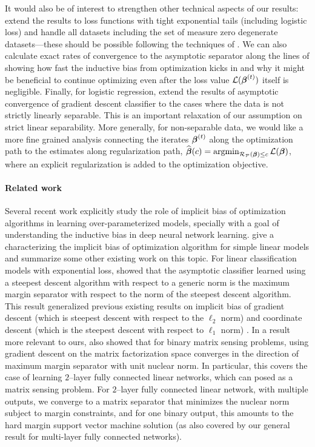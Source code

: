 \documentclass{article}
\renewcommand{\c}{\mathcal}
\renewcommand{\hat}{\widehat}
\DeclareMathOperator*{\argmin}{\mathrm{argmin}}
\newcommand{\w}[1][]{\ifthenelse{\equal{#1}{}}{\boldsymbol{\beta}}{\boldsymbol{\beta}^{(#1)}}}
\renewcommand{\P}{\mathcal{P}}
\begin{document}
It would also be of interest to strengthen other technical aspects of our results: extend the results to loss functions with tight exponential tails (including logistic loss) and handle all datasets including the set of measure zero degenerate datasets---these should be possible following the techniques of \citet{soudry2017implicit,telgarsky2013margins,ji2018risk}. We can also calculate exact rates of convergence to  the asymptotic separator along the lines of \citet{soudry2017implicit,nacson2018convergence,ji2018risk} showing how fast the inductive bias from optimization kicks in and why it might be beneficial to continue optimizing even after the loss value $\c{L}(\w[t])$ itself is negligible. 
Finally, for logistic regression, \citet{ji2018risk} extend the results of asymptotic convergence of gradient descent classifier to the cases where the data is not strictly linearly separable. This is an important relaxation of our assumption on strict linear separability. More generally, for non-separable data, we would like a more fine grained analysis connecting the iterates $\w^{(t)}$ along the optimization path to the estimates along regularization path, $\hat{\w}(c)=\argmin_{\c{R}_{\P}(\w)\le c}\c{L}(\w)$, where an explicit regularization is added to the optimization objective.  




\iffalse
\paragraph{Related work }Several recent work explicitly study the role of implicit bias of optimization algorithms in learning over-parameterized models, specially with a goal of understanding the inductive bias in deep neural network learning.  \citet{gunasekar2018characterizing} give a characterizing the implicit bias of optimization algorithm for simple linear models and summarize some other existing work on this topic. For linear classification models with exponential loss, \citet{gunasekar2018characterizing} showed that the asymptotic classifier learned using a  steepest descent algorithm with respect to a generic norm is the maximum margin separator with respect to the norm of the steepest descent algorithm. This result generalized previous existing results on implicit bias of gradient descent (which is steepest descent with respect to the $\ell_2$ norm) \citep{soudry2017implicit} and coordinate descent (which is the steepest descent with respect to $\ell_1$ norm) \cite{telgarsky2013margins}. In a result more relevant to ours,  \citet{gunasekar2018characterizing} also showed that for binary matrix sensing problems, using gradient descent on the matrix factorization space converges in the direction of maximum margin separator with unit nuclear norm. In particular, this covers the case of learning $2$--layer fully connected linear networks, which can  posed as a matrix sensing problem. For $2$--layer fully connected linear network, with multiple outputs, we converge to a matrix separator that minimizes the nuclear norm subject to margin constraints, and for one  binary output, this amounts to the hard margin support vector machine solution (as also covered by our general result for multi-layer fully connected networks).  
\end{document}

